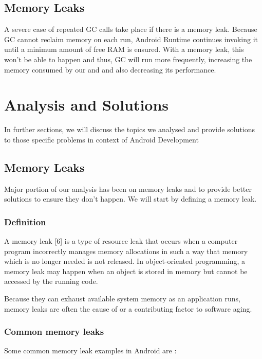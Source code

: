 \documentclass[journal]{IEEEtran}
\begin{document}
\subsection{Memory Leaks}
A severe case of repeated GC calls take place if there is a memory leak. Because GC cannot reclaim memory on each run, Android Runtime continues invoking it until a minimum amount of free RAM is ensured. With a memory leak, this won't be able to happen and thus, GC will run more frequently, increasing the memory consumed by our and and also decreasing its performance.

\newpage

\section{Analysis and Solutions}
In further sections, we will discuss the topics we analysed and provide solutions to those specific problems in context of Android Development

\subsection{Memory Leaks}
Major portion of our analysis has been on memory leaks and to provide better solutions to ensure they don't happen. We will start by defining a memory leak.\\

\subsubsection{Definition}
A memory leak [6] is a type of resource leak that occurs when a computer program incorrectly manages memory allocations in such a way that memory which is no longer needed is not released. In object-oriented programming, a memory leak may happen when an object is stored in memory but cannot be accessed by the running code.

Because they can exhaust available system memory as an application runs, memory leaks are often the cause of or a contributing factor to software aging.\\

\subsubsection{Common memory leaks}

Some common memory leak examples in Android are :\\
\end{document}
